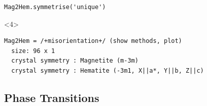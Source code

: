 \documentclass[compress]{beamer}
\begin{document}
\begin{frame}[fragile]
\begin{overlayarea}{\textwidth}{8cm}
\pause

\begin{lstlisting}[style=input]
Mag2Hem.symmetrise('unique')
\end{lstlisting}

\begin{onlyenv}<4>
  \vspace{-.3cm}
  \begin{lstlisting}[style=output]
Mag2Hem = /+misorientation+/ (show methods, plot)
  size: 96 x 1
  crystal symmetry : Magnetite (m-3m)
  crystal symmetry : Hematite (-3m1, X||a*, Y||b, Z||c)
\end{lstlisting}
\end{onlyenv}
\end{overlayarea}
\end{frame}



\subsection*{Phase Transitions}
\end{document}
